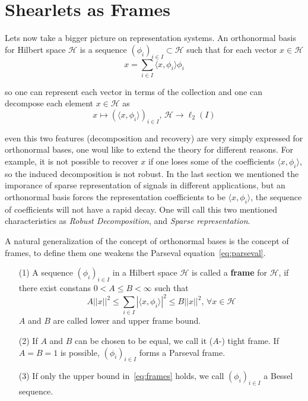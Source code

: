 \section{Shearlets as Frames}
\label{sec:ShearletsFrames}

Lets now take a bigger picture on representation systems. An orthonormal basis for Hilbert space $\mathcal{H}$ is a sequence $(\phi_i)_{i\in I}\subset\mathcal{H}$ such that for each vector $x\in\mathcal{H}$
\begin{equation}
\label{eq:parseval}
x=\sum_{i\in I}\langle x,\phi_i\rangle \phi_i
\end{equation}

so one can represent each vector in terms of the collection and one can decompose each element $x\in\mathcal{H}$ as
$$
x\mapsto (\langle x,\phi_i\rangle)_{i\in I}\text{,  }\mathcal{H}\longrightarrow \ell_2(I)
$$

even this two features (decomposition and recovery) are very simply expressed for orthonormal bases, one woul like to extend the theory for different reasons. For example, it is not possible to recover $x$ if one loses some of the coefficients $\langle x, \phi_i\rangle$, so the induced decomposition is not robust. In the last section we mentioned the imporance of sparse representation of signals in different applications, but an orthonormal basis forces the representation coefficients to be $\langle x,\phi_i\rangle$, the sequence of coefficients will not have a rapid decay. One will call this two mentioned characteristics as \textit{Robust Decomposition}, and \textit{Sparse representation}. 

\bigskip

A natural generalization of the concept of orthonormal bases is the concept of frames, to define them one weakens the Parseval equation~\ref{eq:parseval}.

\bigskip

\begin{defn}[Frames]
\label{def:frames}
\begin{enumerate}
\item[(1)] A sequence $(\phi_i)_{i\in I}$ in a Hilbert space $\mathcal{H}$ is called a \textbf{frame} for $\mathcal{H}$, if there exist constans $0<A\leq B<\infty$ such that
\begin{equation}
\label{eq:frames}
A||x||^2\leq \sum_{i\in I}|\langle x,\phi_i\rangle|^2\leq B||x||^2 \text{,  }\forall x\in \mathcal{H}
\end{equation}
$A$ and $B$ are called lower and upper frame bound.
\item[(2)] If $A$ and $B$ can be chosen to be equal, we call it ($A$-) tight frame. If $A=B=1$ is possible, $(\phi_i)_{i\in I}$ forms a Parseval frame.
\item[(3)] If only the upper bound in~\ref{eq:frames} holds, we call $(\phi_i)_{i\in I}$ a Bessel sequence.
\end{enumerate}
\end{defn}

